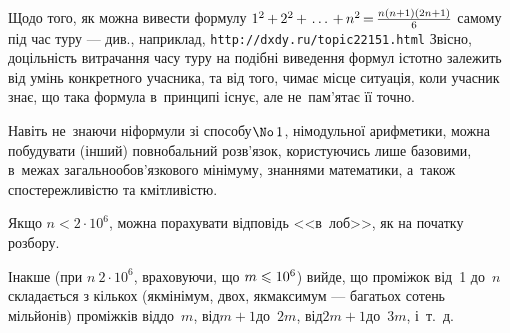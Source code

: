 Щодо того, як можна вивести формулу $1^2\dib{{+}}2^2\dib{{+}}\dots\dib{{+}}n^2\dib{{=}}\frac{n(n+1)(2n+1)}{6}$ самому під час туру --- див., наприклад, \verb"http://dxdy.ru/topic22151.html"\hspace{0.5em plus 1em} Звісно, доцільність витрачання часу туру на подібні виведення формул істотно залежить від умінь конкретного учасника, та від того, чи\nolinebreak[3] має місце ситуація, коли учасник знає, що така формула в~принципі існує, але не~пам'ятає її точно.


Навіть не~знаючи ні\nolinebreak[2] формули зі способу\nolinebreak[3] $\No\,1$, ні\nolinebreak[2] модульної арифметики, можна побудувати (інший) повнобальний розв'язок, користуючись лише базовими, в~межах загальнообов'язкового мінімуму, знаннями математики, а~також спостережливістю та кмітливістю.

Якщо $n < 2{\cdot}10^6$, можна порахувати відповідь <<в~лоб>>, як на початку розбору.

Інакше (при $n \> 2{\cdot}10^6$, враховуючи, що ${m\leqslant10^6}$) вийде, що проміжок від~1 до~$n$ складається з кількох (як\nolinebreak[3] мінімум, двох, як\nolinebreak[3] максимум --- багатьох сотень мільйонів) проміжків від\nolinebreak[2] до~$m$, від\nolinebreak[2] ${m{+}1}$\nolinebreak[2] до~$2m$, від\nolinebreak[2] ${2m{+}1}$\nolinebreak[2] до~$3m$, і~т.~д.

\vspace{0.375\baselineskip}


